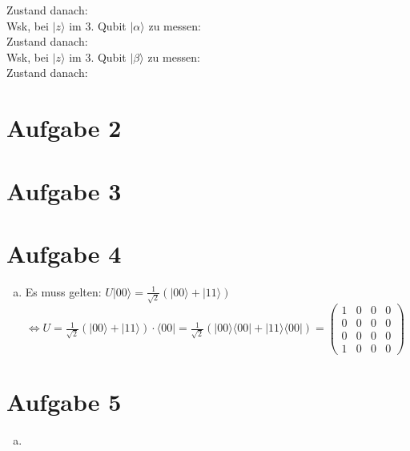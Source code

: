 \documentclass[a4paper]{scrartcl}
\begin{document}
Zustand danach:\\
Wsk, bei $|z\rangle$ im 3. Qubit $|\alpha\rangle$ zu messen:\\

Zustand danach:\\
Wsk, bei $|z\rangle$ im 3. Qubit $|\beta\rangle$ zu messen:\\

Zustand danach:\\
\newpage
\section*{Aufgabe 2}


\newpage
\section*{Aufgabe 3}


\newpage
\section*{Aufgabe 4}
\begin{enumerate}[a)]

\item Es muss gelten: $U |00\rangle=\frac{1}{\sqrt{2}}(|00\rangle + |11\rangle )$\\
$\Leftrightarrow U = \frac{1}{\sqrt{2}}(|00 \rangle + |11\rangle)\cdot \langle 00|= \frac{1}{\sqrt{2}}(|00\rangle \langle 00|+|11\rangle \langle 00|)= \begin{pmatrix}
1&0&0&0\\
0&0&0&0\\
0&0&0&0\\
1&0&0&0
\end{pmatrix}$
\end{enumerate}
\newpage
\section*{Aufgabe 5}
\begin{enumerate}[a)]

\item
\end{enumerate}
\end{document}
